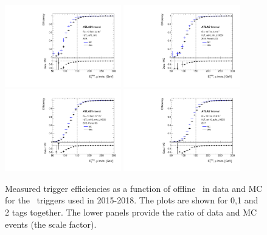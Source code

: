 \begin{figure}[tb!]
	\centering
	\includegraphics[width=0.45\textwidth]{chapters/c6/fig/METTriggerCalibration/efficiecy_HLT_xe70_mht.pdf}
	\includegraphics[width=0.45\textwidth]{chapters/c6/fig/METTriggerCalibration/efficiecy_HLT_xe90_mht_L1XE50.pdf}
	\includegraphics[width=0.45\textwidth]{chapters/c6/fig/METTriggerCalibration/efficiecy_HLT_xe110_mht_L1XE50.pdf}
	\includegraphics[width=0.45\textwidth]{chapters/c6/fig/METTriggerCalibration/efficiecy_HLT_xe110_pufit_L1XE55.pdf}
	\caption{Measured trigger efficiencies as a function of offline \METnomu~in data and MC for the \MET~triggers used in 2015-2018. The plots are shown for 0,1 and 2 tags together. The lower panels provide the ratio of data and MC events (the scale factor).}
	\label{fig:TrigEff}
\end{figure}
